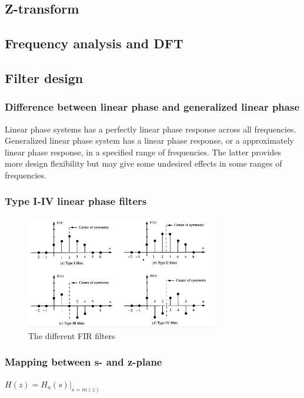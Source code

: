 \documentclass{article}
\begin{document}
\subsection{Z-transform}

\subsection{Frequency analysis and DFT}

\subsection{Filter design}
\subsubsection{Difference between linear phase and generalized linear phase}
Linear phase systems has a perfectly linear phase response across all frequencies. Generalized linear phase system has a linear phase response, or a approximately linear phase response, in a specified range of frequencies. The latter provides more design flexibility but may give some undesired effects in some ranges of frequencies.

\subsubsection{Type I-IV linear phase filters}

\begin{figure}[h!]
    \centering
    \includegraphics[width=0.75\textwidth]{figures/Filter design/filter_types.png}
    \caption{The different FIR filters}
    \label{fig:filter_types}
\end{figure}

\subsubsection{Mapping between s- and z-plane}
$H(z) = H_a(s) \Big|_{s=m(z)}$
\end{document}
